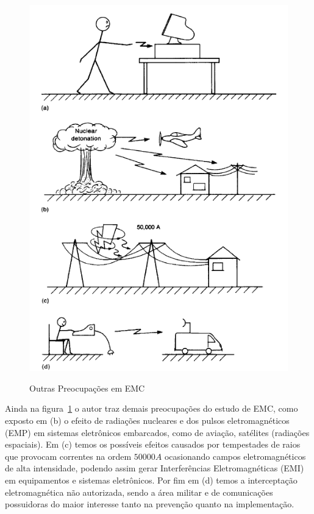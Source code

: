 \begin{figure}[htb!]
	\centering 
	\caption{Outras Preocupações em EMC}
	\includegraphics[scale=0.75]{./img/fundamentacao_002}
	\label{fig:EMC_preocups}
\end{figure}

Ainda na figura~\ref{fig:EMC_preocups} o autor \cite[p.~8]{paul2006} traz demais preocupações do estudo de EMC, como exposto em (b) o efeito de radiações nucleares e dos pulsos eletromagnéticos (EMP) em sistemas eletrônicos embarcados, como de aviação, satélites (radiações espaciais). Em (c) temos os possíveis efeitos causados por tempestades de raios que provocam correntes na ordem $50000 A$ ocasionando campos eletromagnéticos de alta intensidade, podendo assim gerar Interferências Eletromagnéticas (EMI) em equipamentos e sistemas eletrônicos. Por fim em (d) temos a interceptação eletromagnética não autorizada, sendo a área militar e de comunicações possuidoras do maior interesse tanto na prevenção quanto na implementação.

